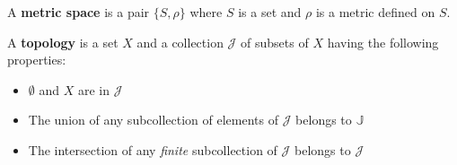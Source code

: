\par\vspace{1 cm}
\begin{definition*} A \textbf{metric space} is a pair $\{S,\rho\}$ where $S$ is a set and $\rho$ is a metric defined on $S$.
\end{definition*}
\par\vspace{1 cm}
\begin{definition*}[topology] A \textbf{topology} is a set $X$ and a collection $\mathcal{J}$ of subsets of $X$ having the following properties:
\begin{itemize}
\item $\emptyset$ and $X$ are in $\mathcal{J}$
\item The union of any subcollection of elements of $\mathcal{J}$ belongs to $\mathbb{J}$
\item The intersection of any \textit{finite} subcollection of $\mathcal{J}$ belongs to $\mathcal{J}$
\end{itemize} 
\end{definition*}

